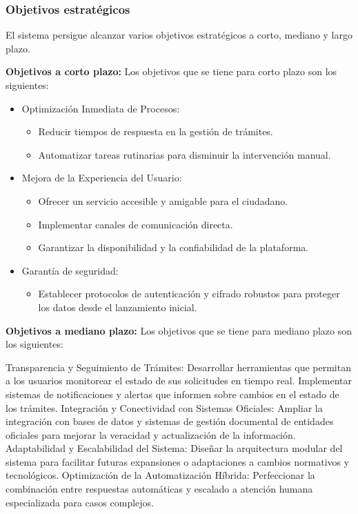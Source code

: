 \subsubsection{Objetivos estratégicos}
El sistema persigue alcanzar varios objetivos estratégicos a corto, mediano y largo plazo.

\textbf{Objetivos a corto plazo:}
Los objetivos que se tiene para corto plazo son los siguientes:

\begin{itemize}
    \item Optimización Inmediata de Procesos: 
    \begin{itemize}
        \item Reducir tiempos de respuesta en la gestión de trámites.
        \item Automatizar tareas rutinarias para disminuir la intervención manual.
    \end{itemize}
    \item Mejora de la Experiencia del Usuario:
    \begin{itemize}
        \item Ofrecer un servicio accesible y amigable para el ciudadano.
        \item Implementar canales de comunicación directa.
        \item Garantizar la disponibilidad y la confiabilidad de la plataforma.
    \end{itemize}
    \item Garantía de seguridad:
    \begin{itemize}
        \item Establecer protocolos de autenticación y cifrado robustos para proteger los datos desde el lanzamiento inicial.
    \end{itemize}
\end{itemize}

\textbf{Objetivos a mediano plazo:}
Los objetivos que se tiene para mediano plazo son los siguientes:

Transparencia y Seguimiento de Trámites:
Desarrollar herramientas que permitan a los usuarios monitorear el estado de sus solicitudes en tiempo real.
Implementar sistemas de notificaciones y alertas que informen sobre cambios en el estado de los trámites.
Integración y Conectividad con Sistemas Oficiales:
Ampliar la integración con bases de datos y sistemas de gestión documental de entidades oficiales para mejorar la veracidad y actualización de la información.
Adaptabilidad y Escalabilidad del Sistema:
Diseñar la arquitectura modular del sistema para facilitar futuras expansiones o adaptaciones a cambios normativos y tecnológicos.
Optimización de la Automatización Híbrida:
Perfeccionar la combinación entre respuestas automáticas y escalado a atención humana especializada para casos complejos.

